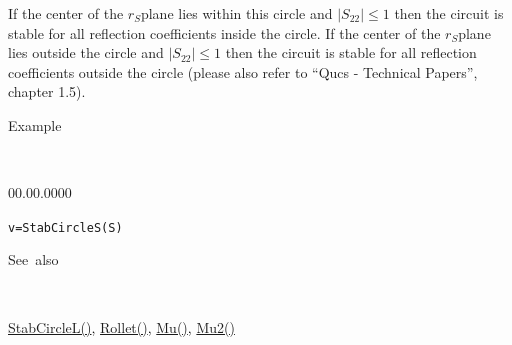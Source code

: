 \noindent If the center of the $r_{S}$plane lies within this circle
and $\left|S_{22}\right|\leq1$ then the circuit is stable for all
reflection coefficients inside the circle. If the center of the $r_{S}$plane
lies outside the circle and $\left|S_{22}\right|\leq1$ then the circuit
is stable for all reflection coefficients outside the circle (please
also refer to {}``Qucs - Technical Papers'', chapter 1.5).

\begin{description}
\item [Example]~
\end{description}
\begin{lyxlist}{00.00.0000}
\item [\texttt{v=StabCircleS(S)}]~
\end{lyxlist}
\begin{description}
\item [See~also]~
\end{description}
\textcolor{blue}{\hyperlink{StabCircleL}{StabCircleL()}}\textcolor{black}{,}
\textcolor{blue}{\hyperlink{Rollet}{Rollet()}}\textcolor{black}{,}
\textcolor{blue}{\hyperlink{Mu}{Mu()}}\textcolor{black}{,} \textcolor{blue}{\hyperlink{Mu2}{Mu2()}}
